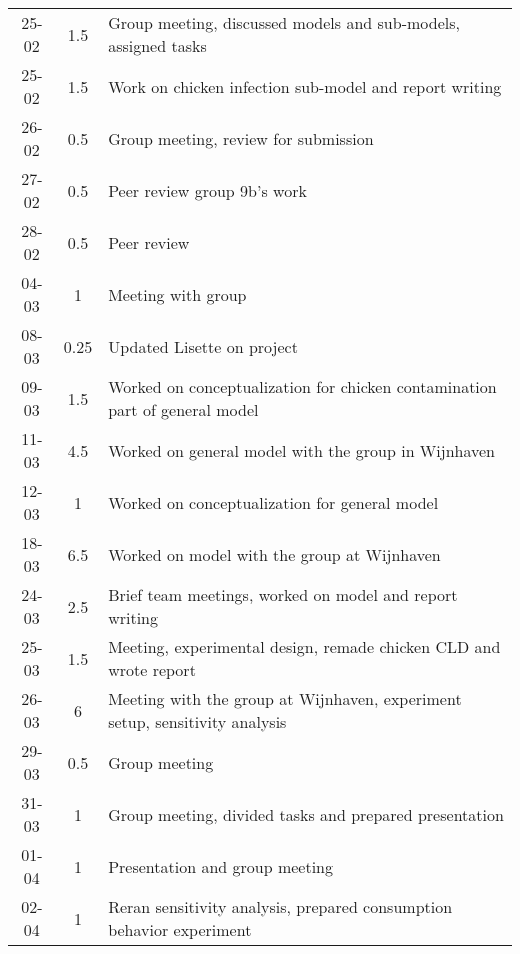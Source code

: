 \begin{longtable}[c]{c|c|m{35em}}
25-02   &   1.5     &   Group meeting, discussed models and sub-models, assigned tasks              \\
25-02   &   1.5     &   Work on chicken infection sub-model and report writing                      \\
26-02   &   0.5     &   Group meeting, review for submission                                        \\
27-02   &   0.5     &   Peer review group 9b's work                                                 \\
28-02   &   0.5     &   Peer review                                                                 \\
04-03   &   1       &   Meeting with group                                                          \\
08-03   &   0.25    &   Updated Lisette on project                                                  \\
09-03   &   1.5     &   Worked on conceptualization for chicken contamination part of general model \\
11-03   &   4.5     &   Worked on general model with the group in Wijnhaven                         \\
12-03   &   1       &   Worked on conceptualization for general model                               \\
18-03   &   6.5     &   Worked on model with the group at Wijnhaven                                 \\
24-03   &   2.5     &   Brief team meetings, worked on model and report writing                     \\
25-03   &   1.5     &   Meeting, experimental design, remade chicken CLD and wrote report           \\
26-03   &   6       &   Meeting with the group at Wijnhaven, experiment setup, sensitivity analysis \\
29-03   &   0.5     &   Group meeting                                                               \\
31-03   &   1       &   Group meeting, divided tasks and prepared presentation                      \\
01-04   &   1       &   Presentation and group meeting                                              \\
02-04   &   1       &   Reran sensitivity analysis, prepared consumption behavior experiment        \\



\end{longtable}

